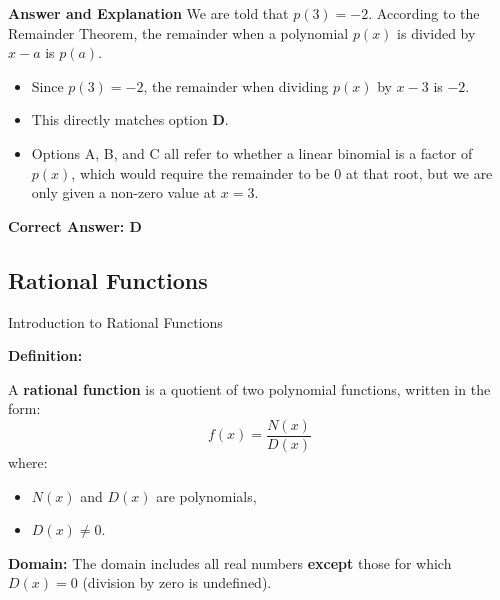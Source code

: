 \documentclass{beamer}
\begin{document}
\begin{frame}{\textbf{Answer and Explanation}}
We are told that \( p(3) = -2 \). According to the Remainder Theorem, the remainder when a polynomial \( p(x) \) is divided by \( x - a \) is \( p(a) \).

\begin{itemize}
    \item Since \( p(3) = -2 \), the remainder when dividing \( p(x) \) by \( x - 3 \) is \(-2\).
    \item This directly matches option \textbf{D}.
    \item Options A, B, and C all refer to whether a linear binomial is a factor of \( p(x) \), which would require the remainder to be 0 at that root, but we are only given a non-zero value at \( x = 3 \).
\end{itemize}

\textbf{Correct Answer: D}
\end{frame}



    

\begin{frame}
\section{Rational Functions}
\end{frame}

\begin{frame}{Introduction to Rational Functions}
\small

\textbf{Definition:}

A \textbf{rational function} is a quotient of two polynomial functions, written in the form:
\[
f(x) = \frac{N(x)}{D(x)}
\]
where:
\begin{itemize}
    \item $N(x)$ and $D(x)$ are polynomials,
    \item $D(x) \ne 0$.
\end{itemize}

\vspace{0.2cm}
\textbf{Domain:}  
The domain includes all real numbers \textbf{except} those for which $D(x) = 0$ (division by zero is undefined).

\end{frame}
\end{document}
